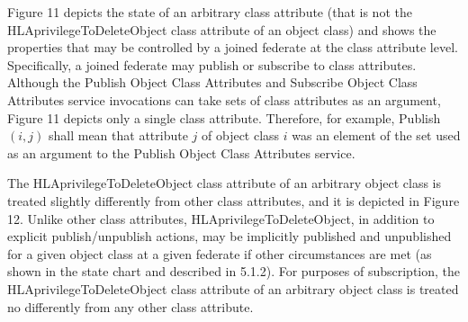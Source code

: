 Figure 11 depicts the state of an arbitrary class attribute (that is not the HLAprivilegeToDeleteObject class attribute of an object class) and shows the properties that may be controlled by a joined federate at the class attribute level. Specifically, a joined federate may publish or subscribe to class attributes. Although the Publish Object Class Attributes and Subscribe Object Class Attributes service invocations can take sets of class attributes as an argument, Figure 11 depicts only a single class attribute. Therefore, for example, Publish $(i,j)$ shall mean that attribute $j$ of object class $i$ was an element of the set used as an argument to the Publish Object Class Attributes service.

The HLAprivilegeToDeleteObject class attribute of an arbitrary object class is treated slightly differently from other class attributes, and it is depicted in Figure 12. Unlike other class attributes, HLAprivilegeToDeleteObject, in addition to explicit publish/unpublish actions, may be implicitly published and unpublished for a given object class at a given federate if other circumstances are met (as shown in the state chart and described in 5.1.2). For purposes of subscription, the HLAprivilegeToDeleteObject class attribute of an arbitrary object class is treated no differently from any other class attribute.

\clearpage

\mbox{}\vfill

\clearpage

\mbox{}\vfill

